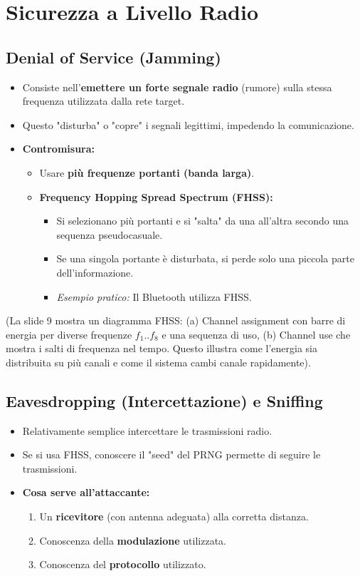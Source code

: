 \section{Sicurezza a Livello Radio}
\subsection{Denial of Service (Jamming)}
\begin{itemize}
    \item Consiste nell'\textbf{emettere un forte segnale radio} (rumore) sulla stessa frequenza utilizzata dalla rete target.
    \item Questo "disturba" o "copre" i segnali legittimi, impedendo la comunicazione.
    \item \textbf{Contromisura:}
    \begin{itemize}
        \item Usare \textbf{più frequenze portanti (banda larga)}.
        \item \textbf{Frequency Hopping Spread Spectrum (FHSS):}
        \begin{itemize}
            \item Si selezionano più portanti e si "salta" da una all'altra secondo una sequenza pseudocasuale.
            \item Se una singola portante è disturbata, si perde solo una piccola parte dell'informazione.
            \item \textit{Esempio pratico:} Il Bluetooth utilizza FHSS.
        \end{itemize}
    \end{itemize}
\end{itemize}
(La slide 9 mostra un diagramma FHSS: (a) Channel assignment con barre di energia per diverse frequenze $f_1..f_8$ e una sequenza di uso, (b) Channel use che mostra i salti di frequenza nel tempo. Questo illustra come l'energia sia distribuita su più canali e come il sistema cambi canale rapidamente).

\subsection{Eavesdropping (Intercettazione) e Sniffing}
\begin{itemize}
    \item Relativamente semplice intercettare le trasmissioni radio.
    \item Se si usa FHSS, conoscere il "seed" del PRNG permette di seguire le trasmissioni.
    \item \textbf{Cosa serve all'attaccante:}
    \begin{enumerate}
        \item Un \textbf{ricevitore} (con antenna adeguata) alla corretta distanza.
        \item Conoscenza della \textbf{modulazione} utilizzata.
        \item Conoscenza del \textbf{protocollo} utilizzato.
    \end{enumerate}
\end{itemize}

